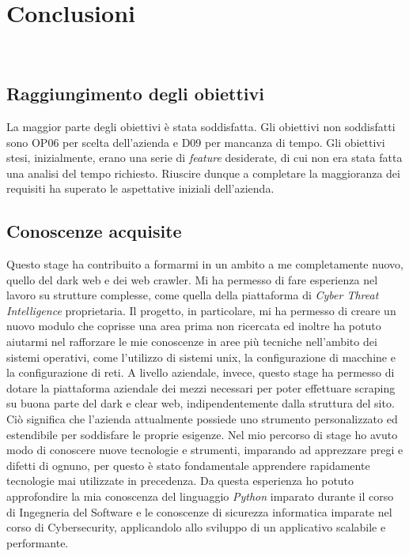 

\chapter{Conclusioni}
\label{cap:conclusioni}
\\
\section{Raggiungimento degli obiettivi}
La maggior parte degli obiettivi è stata soddisfatta. Gli obiettivi non soddisfatti sono OP06 per scelta dell’azienda e D09 per mancanza di tempo. Gli obiettivi stesi, inizialmente, erano una serie di \emph{feature} desiderate, di cui non era stata fatta una analisi del tempo richiesto. Riuscire dunque a completare la maggioranza dei requisiti ha superato le aspettative iniziali dell’azienda.

\section{Conoscenze acquisite}
Questo stage ha contribuito a formarmi in un ambito a me completamente nuovo, quello del dark web e dei web crawler. Mi ha permesso di fare esperienza nel lavoro su strutture complesse, come quella della piattaforma di \emph{Cyber Threat Intelligence} proprietaria. Il progetto, in particolare, mi ha permesso di creare un nuovo modulo che coprisse una area prima non ricercata ed inoltre ha potuto aiutarmi nel rafforzare le mie conoscenze in aree più tecniche nell’ambito dei sistemi operativi, come l’utilizzo di sistemi unix, la configurazione di macchine e la configurazione di reti. A livello aziendale, invece, questo stage ha permesso di dotare la piattaforma aziendale dei mezzi necessari per poter effettuare scraping su buona parte del dark e clear web, indipendentemente dalla struttura del sito. Ciò significa che l’azienda attualmente possiede uno strumento personalizzato ed estendibile per soddisfare le proprie esigenze. \newline{}
Nel mio percorso di stage ho avuto modo di conoscere nuove tecnologie e strumenti, imparando ad apprezzare pregi e difetti di ognuno, per questo è stato fondamentale apprendere rapidamente tecnologie mai utilizzate in precedenza.
Da questa esperienza ho potuto approfondire la mia conoscenza del linguaggio \emph{Python} imparato durante il corso di Ingegneria del Software e le conoscenze di sicurezza informatica imparate nel corso di Cybersecurity, applicandolo allo sviluppo di un applicativo scalabile e performante.
\newpage
